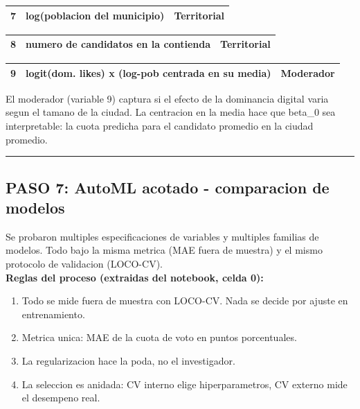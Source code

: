 \documentclass[11pt,a4paper]{article}
\begin{document}
{\begin{center}
\begin{tabular}{lll}
\hline
\end{tabular}
\end{center}
\begin{center}
\begin{tabular}{lll}
\hline
7 & log(poblacion del municipio) & Territorial \\
\hline
\end{tabular}
\end{center}
\begin{center}
\begin{tabular}{lll}
\hline
8 & numero de candidatos en la contienda & Territorial \\
\hline
\end{tabular}
\end{center}
\begin{center}
\begin{tabular}{lll}
\hline
9 & logit(dom. likes) x (log-pob centrada en su media) & Moderador \\
\hline
\end{tabular}
\end{center}

El moderador (variable 9) captura si el efecto de la dominancia digital varia segun el tamano de la ciudad. La centracion en la media hace que beta_0 sea interpretable: la cuota predicha para el candidato promedio en la ciudad promedio.\\[2pt]

\vspace{4pt}\noindent\rule{\linewidth}{0.4pt}\vspace{4pt}

\subsection{PASO 7: AutoML acotado - comparacion de modelos}

Se probaron multiples especificaciones de variables y multiples familias de modelos. Todo bajo la misma metrica (MAE fuera de muestra) y el mismo protocolo de validacion (LOCO-CV).\\[2pt]

\textbf{Reglas del proceso (extraidas del notebook, celda 0):}\\[2pt]
\begin{enumerate}[noitemsep,topsep=2pt]
\item Todo se mide fuera de muestra con LOCO-CV. Nada se decide por ajuste en entrenamiento.
\item Metrica unica: MAE de la cuota de voto en puntos porcentuales.
\item La regularizacion hace la poda, no el investigador.
\item La seleccion es anidada: CV interno elige hiperparametros, CV externo mide el desempeno real.
\end{enumerate}

}
\end{document}
